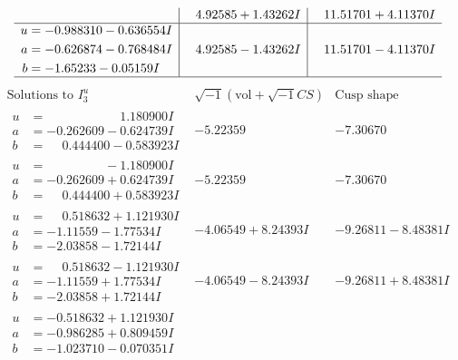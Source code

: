 \documentclass[1p]{elsarticle_modified}
\theoremstyle{definition}
\newcommand{\I}{\sqrt{-1}}
\begin{document}
$$\begin{array}{c|c|c}
 & \phantom{-}4.92585 + 1.43262 I & \phantom{-}11.51701 + 4.11370 I \\ \hline\begin{aligned}
u &= -0.988310 - 0.636554 I \\
a &= -0.626874 - 0.768484 I \\
b &= -1.65233 - 0.05159 I\end{aligned}
 & \phantom{-}4.92585 - 1.43262 I & \phantom{-}11.51701 - 4.11370 I\\
 \hline 
 \end{array}$$\newpage$$\begin{array}{c|c|c}  
\text{Solutions to }I^u_{3}& \I (\text{vol} + \sqrt{-1}CS) & \text{Cusp shape}\\
 \hline 
\begin{aligned}
u &= \phantom{-0.000000 -}1.180900 I \\
a &= -0.262609 - 0.624739 I \\
b &= \phantom{-}0.444400 - 0.583923 I\end{aligned}
 & -5.22359\phantom{ +0.000000I} & -7.30670\phantom{ +0.000000I} \\ \hline\begin{aligned}
u &= \phantom{-0.000000 } -1.180900 I \\
a &= -0.262609 + 0.624739 I \\
b &= \phantom{-}0.444400 + 0.583923 I\end{aligned}
 & -5.22359\phantom{ +0.000000I} & -7.30670\phantom{ +0.000000I} \\ \hline\begin{aligned}
u &= \phantom{-}0.518632 + 1.121930 I \\
a &= -1.11559 - 1.77534 I \\
b &= -2.03858 - 1.72144 I\end{aligned}
 & -4.06549 + 8.24393 I & -9.26811 - 8.48381 I \\ \hline\begin{aligned}
u &= \phantom{-}0.518632 - 1.121930 I \\
a &= -1.11559 + 1.77534 I \\
b &= -2.03858 + 1.72144 I\end{aligned}
 & -4.06549 - 8.24393 I & -9.26811 + 8.48381 I \\ \hline\begin{aligned}
u &= -0.518632 + 1.121930 I \\
a &= -0.986285 + 0.809459 I \\
b &= -1.023710 - 0.070351 I\end{aligned}

\end{array}$$
\end{document}
